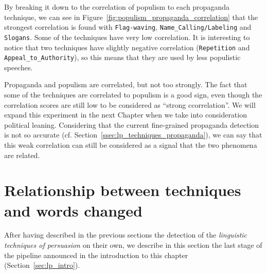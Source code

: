 By breaking it down to the correlation of populism to each propaganda technique, we can see in Figure~\ref{fig:populism_propaganda_correlation} that the strongest correlation is found with \texttt{Flag-waving}, \texttt{Name\_Calling/Labeling} and \texttt{Slogans}. Some of the techniques have very low correlation. It is interesting to notice that two techniques have slightly negative correlation (\texttt{Repetition} and \texttt{Appeal\_to\_Authority}), so this means that they are used by less populistic speeches.



Propaganda and populism are correlated, but not too strongly.
The fact that some of the techniques are correlated to populism is a good sign, even though the correlation scores are still low to be considered as ``strong ccorrelation''. We will expand this experiment in the next Chapter when we take into consideration political leaning.
Considering that the current fine-grained propaganda detection is not so accurate (cf. Section~\ref{ssec:lp_techniques_propaganda}), we can say that this weak correlation can still be considered as a signal that the two phenomena are related.



\section{Relationship between techniques and words changed}
\label{sec:lp_relationship}

After having described in the previous sections the detection of the \emph{linguistic techniques of persuasion} on their own, we describe in this section the last stage of the pipeline announced in the introduction to this chapter (Section~\ref{sec:lp_intro}).

